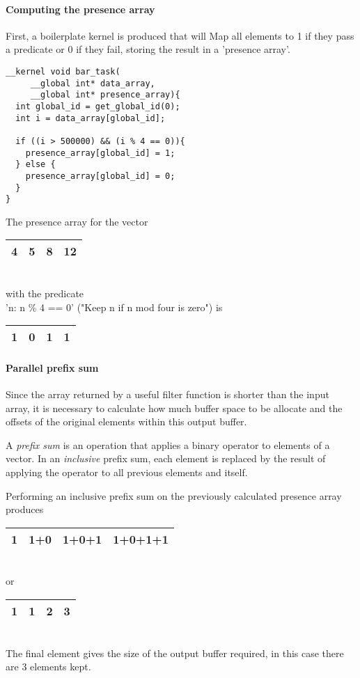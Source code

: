     \paragraph{Computing the presence array}
    First, a boilerplate kernel is produced that will Map all elements to 1 if they pass a predicate or 0 if they fail, storing the result in a 'presence array'.

    \begin{verbatim}
__kernel void bar_task(
     __global int* data_array,
     __global int* presence_array){
  int global_id = get_global_id(0);
  int i = data_array[global_id];

  if ((i > 500000) && (i % 4 == 0)){
    presence_array[global_id] = 1;
  } else {
    presence_array[global_id] = 0;
  }
}
\end{verbatim}
    The presence array for the vector
    \begin{tabular}{ | c | c | c | c |}
      \hline
        4 & 5 & 8 & 12 \\
      \hline
    \end{tabular}
    \\
    with the predicate
    \\
    'n: n \% 4 == 0' ("Keep n if n mod four is zero") is
    \\
   \begin{tabular}{ | c | c | c | c |}
      \hline
        1 & 0 & 1 & 1 \\
      \hline
    \end{tabular}
 
    \paragraph{Parallel prefix sum}
    Since the array returned by a useful filter function is shorter than the input array, it is necessary to calculate how much buffer space to be allocate and the offsets of the original elements within this output buffer.

    A \emph{prefix sum} is an operation that applies a binary operator to elements of a vector. In an \emph{inclusive} prefix sum, each element is replaced by the result of applying the operator to all previous elements and itself.

  Performing an inclusive prefix sum on the previously calculated presence array produces
  \begin{tabular}{ | c | c | c | c |}
    \hline
      1 & 1+0 & 1+0+1 & 1+0+1+1 \\
    \hline
  \end{tabular}
    \\ or \\
  \begin{tabular}{ | c | c | c | c |}
    \hline
      1 & 1 & 2 & 3 \\
    \hline
  \end{tabular}
\\
The final element gives the size of the output buffer required, in this case there are $3$ elements kept.

